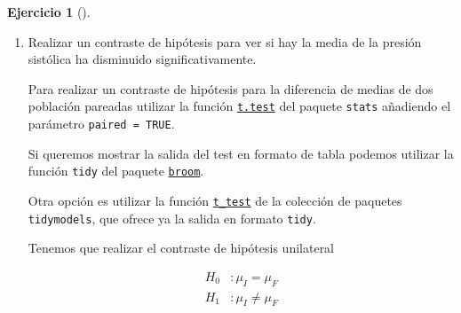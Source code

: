 \documentclass[
  a4paper,
]{scrreport}
\theoremstyle{definition}
\newtheorem{exercise}{Ejercicio}[chapter]
\theoremstyle{remark}
\begin{document}
\begin{exercise}[]
\begin{enumerate}
\begin{tcolorbox}
  \end{tcolorbox}
\item
  Realizar un contraste de hipótesis para ver si hay la media de la
  presión sistólica ha disminuido significativamente.

  \begin{tcolorbox}[enhanced jigsaw, coltitle=black, left=2mm, colback=white, leftrule=.75mm, toptitle=1mm, breakable, bottomrule=.15mm, titlerule=0mm, bottomtitle=1mm, title=\textcolor{quarto-callout-note-color}{\faInfo}\hspace{0.5em}{Ayuda}, arc=.35mm, toprule=.15mm, rightrule=.15mm, colframe=quarto-callout-note-color-frame, opacityback=0, colbacktitle=quarto-callout-note-color!10!white, opacitybacktitle=0.6]

  Para realizar un contraste de hipótesis para la diferencia de medias
  de dos población pareadas utilizar la función
  \href{https://www.rdocumentation.org/packages/stats/versions/3.6.2/topics/t.test}{\texttt{t.test}}
  del paquete \texttt{stats} añadiendo el parámetro
  \texttt{paired\ =\ TRUE}.

  Si queremos mostrar la salida del test en formato de tabla podemos
  utilizar la función \texttt{tidy} del paquete
  \href{https://broom.tidymodels.org/index.html}{\texttt{broom}}.

  Otra opción es utilizar la función
  \href{https://infer.tidymodels.org/reference/t_test.html}{\texttt{t\_test}}
  de la colección de paquetes \texttt{tidymodels}, que ofrece ya la
  salida en formato \texttt{tidy}.

  \end{tcolorbox}

  \begin{tcolorbox}[enhanced jigsaw, coltitle=black, left=2mm, colback=white, leftrule=.75mm, toptitle=1mm, breakable, bottomrule=.15mm, titlerule=0mm, bottomtitle=1mm, title=\textcolor{quarto-callout-tip-color}{\faLightbulb}\hspace{0.5em}{Solución}, arc=.35mm, toprule=.15mm, rightrule=.15mm, colframe=quarto-callout-tip-color-frame, opacityback=0, colbacktitle=quarto-callout-tip-color!10!white, opacitybacktitle=0.6]

  Tenemos que realizar el contraste de hipótesis unilateral

  \begin{align*}
  H_0 &: \mu_I = \mu_F \\
  H_1 &: \mu_I \neq \mu_F 
  \end{align*}


\end{tcolorbox}
\end{enumerate}
\end{exercise}
\end{document}
